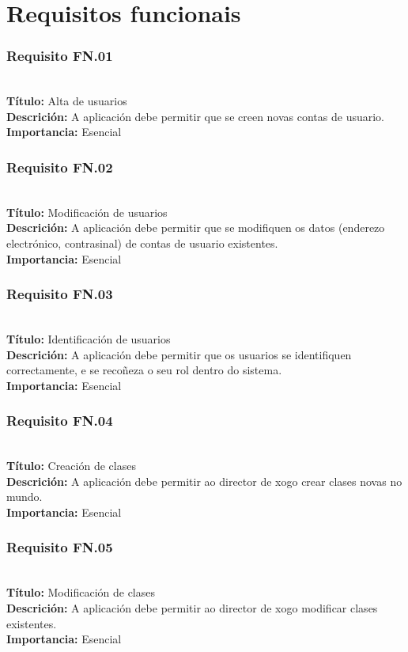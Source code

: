 \section{Requisitos funcionais}
\subsubsection{Requisito FN.01}~\\
{\bf Título:} Alta de usuarios\\
{\bf Descrición:} A aplicación debe permitir que se creen novas contas de usuario.\\
{\bf Importancia:} Esencial

\subsubsection{Requisito FN.02}~\\
{\bf Título:} Modificación de usuarios\\
{\bf Descrición:} A aplicación debe permitir que se modifiquen os datos
(enderezo electrónico, contrasinal) de contas de usuario existentes.\\
{\bf Importancia:} Esencial

\subsubsection{Requisito FN.03}~\\
{\bf Título:} Identificación de usuarios\\
{\bf Descrición:} A aplicación debe permitir que os usuarios se identifiquen
correctamente, e se recoñeza o seu rol dentro do sistema.\\
{\bf Importancia:} Esencial

\subsubsection{Requisito FN.04}~\\
{\bf Título:} Creación de clases\\
{\bf Descrición:} A aplicación debe permitir ao director de xogo crear clases
novas no mundo.\\
{\bf Importancia:} Esencial

\subsubsection{Requisito FN.05}~\\
{\bf Título:} Modificación de clases \\
{\bf Descrición:} A aplicación debe permitir ao director de xogo modificar
clases existentes.\\
{\bf Importancia:} Esencial

